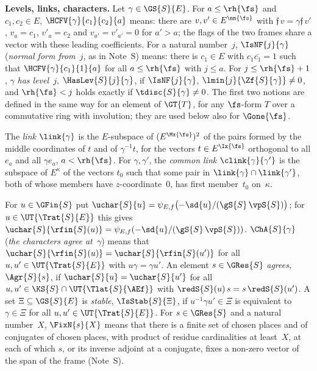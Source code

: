 \documentclass[11pt,a4paper]{article}
\newcommand{\m}[1]{\mbox{$#1$}}        %
\newcommand{\subhead}[1]{\par\addvspace{9pt plus 2pt}\Needspace{4\baselineskip}\noindent\textbf{#1}\enspace\ignorespaces}
\theoremstyle{plainx}
\theoremstyle{uprightx}
\renewcommand{\m}[1]{$#1$}
\newcommand{\sn}{\nn{\fs}}
\newcommand{\sro}{\rh{\fs}}
\newcommand{\gq}{\gS{S}}
\newcommand{\rfi}[1]{\rfin{S}(#1)}
\newcommand{\TE}{\Trat{S}{E}}
\newcommand{\Tl}{\Tlat{S}{\AEf}}
\newcommand{\UE}{\UT{\TE}}
\newcommand{\cj}[1]{\overline{#1}}
\begin{document}
\subhead{Levels, links, characters.} Let \m{\gamma\in\GS{S}{E}}. For \m{a\le\sro} and \m{c_1,c_2\in E},
\m{\HCFV{\gamma}{c_1}{c_2}{a}} means: there are \m{v,v'\in E^{\sn}} with \m{\mathfrak f\,v=\gamma\mathfrak f\,v'},
\m{v_a=c_1}, \m{v'_a=c_2} and \m{v_{a'}=v'_{a'}=0} for \m{a'>a}; the flags of the two frames share a vector with these
leading coefficients. For a natural number~$j$, \m{\IsNF{j}{\gamma}} (\emph{normal form from~$j$}, as in Note~S) means: there
is \m{c_1\in E} with \m{c_1\cj{c_1}=1} such that \m{\HCFV{\gamma}{c_1}{1}{a}} for all \m{a\le\sro} with \m{j\le a}.
For \m{j\le\sro+1}, $\gamma$ \emph{has level~$j$}, \m{\HasLev{S}{j}{\gamma}}, if \m{\IsNF{j}{\gamma}},
\m{\lmin{j}{\Zf{S}{\gamma}}\ne0}, and \m{\sro<j} holds exactly if \m{\tdisc{S}{\gamma}\ne0}. The first two
notions are defined in the same way for an element of \m{\GT{T}}, for any $\fs$-form $T$ over a commutative ring
with involution; they are used below also for \m{\Gone{\fs}}.

The \emph{link} \m{\link{\gamma}} is the $E$-subspace of \m{(E^{\Mx{\fs}})^2} of the pairs formed by the middle
coordinates of $t$ and of \m{\gamma^{-1}t}, for the vectors \m{t\in E^{\Ix{\fs}}} orthogonal to all $e_a$ and all
\m{\gamma e_a}, \m{a<\sro}. For \m{\gamma,\gamma'}, the \emph{common link} \m{\clink{\gamma}{\gamma'}} is the
subspace of \m{E^\kappa} of the vectors $t_0$ such that some pair in \m{\link{\gamma}\cap\link{\gamma'}}, both of whose
members have $z$-coordinate~$0$, has first member~$t_0$ on~$\kappa$.

For \m{u\in\GFin{S}} put \m{\uchar{S}{u}=\psi_{E,f}\bigl(-\sd{u}/(\gq\,\vpS{S})\bigr)}; for
\m{u\in\UE} this gives \m{\uchar{S}{\rfi{u}}=\psi_{E,f}(-\sd{u}/(\gq\,\vpS{S}))}. \m{\ChA{S}{\gamma}} (\emph{the
characters agree at~$\gamma$}) means that \m{\uchar{S}{\rfi{u}}=\uchar{S}{\rfi{u'}}} for all \m{u,u'\in\UE} with
\m{u\gamma=\gamma u'}. An element \m{s\in\GRes{S}} \emph{agrees}, \m{\Agr{S}{s}}, if \m{\uchar{S}{u}=\uchar{S}{u'}}
for all \m{u,u'\in\KS{S}\cap\UT{\Tl}} with \m{\redS{S}(u)\,s=s\,\redS{S}(u')}. A set \m{\Xi\subseteq\GS{S}{E}} is
\emph{stable}, \m{\IsStab{S}{\Xi}}, if \m{u^{-1}\gamma u'\in\Xi} is equivalent to \m{\gamma\in\Xi} for all
\m{u,u'\in\UE}. For \m{s\in\GRes{S}} and a natural number~$X$, \m{\FixN{s}{X}} means that there is a finite set
of chosen places and of conjugates of chosen places, with product of residue cardinalities at least~$X$, at each
of which $s$, or its inverse adjoint at a conjugate, fixes a non-zero vector of the span of the frame
(Note~S).
\end{document}
